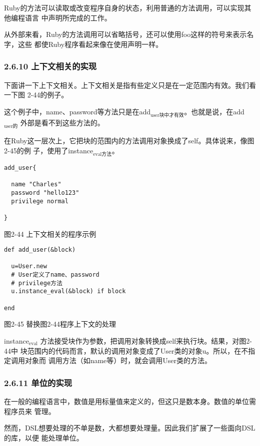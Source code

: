 \documentclass[11pt]{ctexart}
\begin{document}
Ruby的方法可以读取或改变程序自身的状态，利用普通的方法调用，可以实现其他编程语言
中声明所完成的工作。

从外部来看，Ruby的方法调用可以省略括号，还可以使用foo这样的符号来表示名字，这些
都使Ruby程序看起来像在使用声明一样。
\subsubsection{2.6.10 上下文相关的实现}
\label{sec:orgf749fb4}

下面讲一下上下文相关。上下文相关是指有些定义只是在一定范围内有效。我们看一下图
2-44的例子。

这个例子中，name、password等方法只是在add\(_{\text{user块中才有效}}\)。也就是说，在add\(_{\text{user的}}\)
外部是看不到这些方法的。

在Ruby这一层次上，它把块的范围内的方法调用对象换成了self。具体说来，像图2-45的例
子，使用了instance\(_{\text{eval方法}}\)。
\lstset{language=org,label= ,caption= ,captionpos=b,numbers=none}
\begin{lstlisting}
add_user{

  name "Charles"
  password "hello123"
  privilege normal

}
\end{lstlisting}

图2-44 上下文相关的程序示例

\lstset{language=org,label= ,caption= ,captionpos=b,numbers=none}
\begin{lstlisting}
def add_user(&block)

  u=User.new
  # User定义了name、password
  # privilege方法
  u.instance_eval(&block) if block

end

\end{lstlisting}

图2-45 替换图2-44程序上下文的处理

instance\(_{\text{eval}}\) 方法接受块作为参数，把调用对象转换成self来执行块。结果，对图2-44中
块范围内的代码而言，默认的调用对象变成了User类的对象u。所以，在不指定调用对象而
调用方法（如name等）时，就会调用User类的方法。
\subsubsection{2.6.11 单位的实现}
\label{sec:org7dd0db6}

在一般的编程语言中，数值是用标量值来定义的，但这只是数本身。数值的单位需程序员来
管理。

然而，DSL想要处理的不单是数，大都想要处理量。因此我们扩展了一些面向DSL的库，以便
能处理单位。
\end{document}
